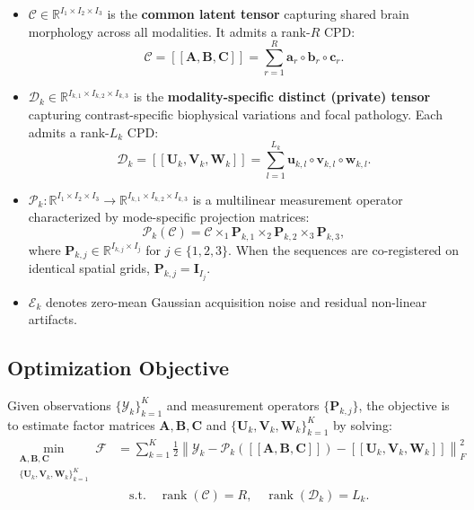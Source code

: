 \documentclass[11pt,a4paper]{article}
\begin{document}
\begin{itemize}[leftmargin=2em]
    \item $\bm{\mathcal{C}} \in \mathbb{R}^{I_1 \times I_2 \times I_3}$ is the \textbf{common latent tensor} capturing shared brain morphology across all modalities. It admits a rank-$R$ CPD:
    \begin{equation}
    \bm{\mathcal{C}} = [\![\mathbf{A}, \mathbf{B}, \mathbf{C}]\!] = \sum_{r=1}^R \mathbf{a}_r \circ \mathbf{b}_r \circ \mathbf{c}_r.
    \end{equation}
    \item $\bm{\mathcal{D}}_k \in \mathbb{R}^{I_{k,1} \times I_{k,2} \times I_{k,3}}$ is the \textbf{modality-specific distinct (private) tensor} capturing contrast-specific biophysical variations and focal pathology. Each admits a rank-$L_k$ CPD:
    \begin{equation}
    \bm{\mathcal{D}}_k = [\![\mathbf{U}_k, \mathbf{V}_k, \mathbf{W}_k]\!] = \sum_{l=1}^{L_k} \mathbf{u}_{k,l} \circ \mathbf{v}_{k,l} \circ \mathbf{w}_{k,l}.
    \end{equation}
    \item $\bm{\mathcal{P}}_k: \mathbb{R}^{I_1 \times I_2 \times I_3} \to \mathbb{R}^{I_{k,1} \times I_{k,2} \times I_{k,3}}$ is a multilinear measurement operator characterized by mode-specific projection matrices:
    \begin{equation}
    \bm{\mathcal{P}}_k(\bm{\mathcal{C}}) = \bm{\mathcal{C}} \times_1 \mathbf{P}_{k,1} \times_2 \mathbf{P}_{k,2} \times_3 \mathbf{P}_{k,3},
    \end{equation}
    where $\mathbf{P}_{k,j} \in \mathbb{R}^{I_{k,j} \times I_j}$ for $j \in \{1, 2, 3\}$. When the sequences are co-registered on identical spatial grids, $\mathbf{P}_{k,j} = \mathbf{I}_{I_j}$.
    \item $\bm{\mathcal{E}}_k$ denotes zero-mean Gaussian acquisition noise and residual non-linear artifacts.
\end{itemize}

\subsection{Optimization Objective}
Given observations $\{\bm{\mathcal{Y}}_k\}_{k=1}^K$ and measurement operators $\{\mathbf{P}_{k,j}\}$, the objective is to estimate factor matrices $\mathbf{A}, \mathbf{B}, \mathbf{C}$ and $\{\mathbf{U}_k, \mathbf{V}_k, \mathbf{W}_k\}_{k=1}^K$ by solving:
\begin{align}
\min_{\substack{\mathbf{A}, \mathbf{B}, \mathbf{C} \\ \{\mathbf{U}_k, \mathbf{V}_k, \mathbf{W}_k\}_{k=1}^K}} \mathcal{F} &= \sum_{k=1}^K \frac{1}{2} \left\| \bm{\mathcal{Y}}_k - \bm{\mathcal{P}}_k([\![\mathbf{A}, \mathbf{B}, \mathbf{C}]\!]) - [\![\mathbf{U}_k, \mathbf{V}_k, \mathbf{W}_k]\!] \right\|_F^2 \nonumber \\
&\quad \text{s.t.} \quad \operatorname{rank}(\bm{\mathcal{C}}) = R, \quad \operatorname{rank}(\bm{\mathcal{D}}_k) = L_k.
\label{eq:objective}
\end{align}
\end{document}
